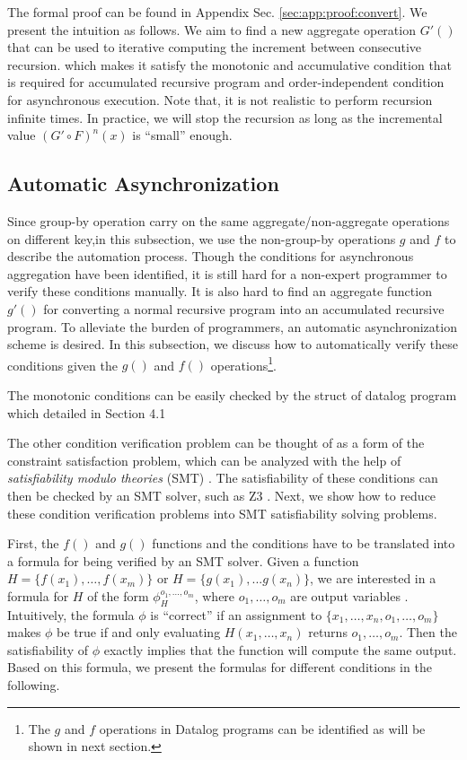 The formal proof can be found in Appendix Sec. \ref{sec:app:proof:convert}. We present the intuition as follows. We aim to find a new aggregate operation $G'()$ that can be used to iterative computing the increment between consecutive recursion. which makes it satisfy the monotonic and accumulative condition that is required for accumulated recursive program and order-independent condition for asynchronous execution.
Note that, it is not realistic to perform recursion infinite times. In practice, we will stop the recursion as long as the incremental value $(G'\circ F)^n(x)$ is ``small'' enough.






\subsection{Automatic Asynchronization}
\label{sec:async:autoasync}
Since group-by operation carry on the same aggregate/non-aggregate operations on different key,in this subsection, we use the non-group-by  operations $g$ and $f$ to describe the  automation process.
Though the conditions for asynchronous aggregation have been identified, it is still hard for a non-expert programmer to verify these conditions manually. It is also hard to find an aggregate function $g'()$ for converting a normal recursive program into an accumulated recursive program.
 To alleviate the burden of programmers, an automatic asynchronization scheme is desired. In this subsection, we discuss how to automatically verify these conditions given the $g()$ and $f()$ operations\footnote{The $g$ and $f$ operations in Datalog programs can be identified as will be shown in next section.}.


 The monotonic conditions can  be easily checked by the struct of datalog program which detailed in Section 4.1

The other condition verification problem can be thought of as a form of the constraint satisfaction problem, which can be analyzed with the help of \emph{satisfiability modulo theories} (SMT) \cite{53e486195688442995f82bfe28c55731}. The satisfiability of these conditions can then be checked by an SMT solver, such as Z3 \cite{DeMoura:2008:ZES:1792734.1792766}. Next, we show how to reduce these condition verification problems into SMT satisfiability solving problems.

First, the $f()$ and $g()$ functions and the conditions have to be translated into a formula for being verified by an SMT solver. Given a function $H=\{f(x_1),\ldots,f(x_m)\}$ or $H=\{g(x_1),...g(x_n)\}$, we are interested in a formula for $H$ of the form $\phi_H^{o_1,\ldots,o_m}$, where $o_1,\ldots,o_m$ are output variables \cite{Liu:2014:ADP:2670979.2670980}. Intuitively, the formula $\phi$ is ``correct'' if an assignment to $\{x_1,\ldots,x_n,o_1,\ldots,o_m\}$ makes $\phi$ be true if and only evaluating $H(x_1,\ldots,x_n)$ returns $o_1,\ldots,o_m$. Then the satisfiability of $\phi$ exactly implies that the function will compute the same output. Based on this formula, we present the formulas for different conditions in the following.

